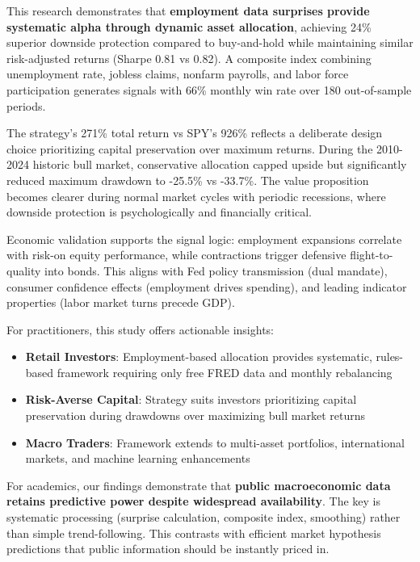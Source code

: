 \documentclass[12pt,a4paper]{article}
\begin{document}
This research demonstrates that \textbf{employment data surprises provide systematic alpha through dynamic asset allocation}, achieving 24\% superior downside protection compared to buy-and-hold while maintaining similar risk-adjusted returns (Sharpe 0.81 vs 0.82). A composite index combining unemployment rate, jobless claims, nonfarm payrolls, and labor force participation generates signals with 66\% monthly win rate over 180 out-of-sample periods.

The strategy's 271\% total return vs SPY's 926\% reflects a deliberate design choice prioritizing capital preservation over maximum returns. During the 2010-2024 historic bull market, conservative allocation capped upside but significantly reduced maximum drawdown to -25.5\% vs -33.7\%. The value proposition becomes clearer during normal market cycles with periodic recessions, where downside protection is psychologically and financially critical.

Economic validation supports the signal logic: employment expansions correlate with risk-on equity performance, while contractions trigger defensive flight-to-quality into bonds. This aligns with Fed policy transmission (dual mandate), consumer confidence effects (employment drives spending), and leading indicator properties (labor market turns precede GDP).

For practitioners, this study offers actionable insights:

\begin{itemize}
    \item \textbf{Retail Investors}: Employment-based allocation provides systematic, rules-based framework requiring only free FRED data and monthly rebalancing

    \item \textbf{Risk-Averse Capital}: Strategy suits investors prioritizing capital preservation during drawdowns over maximizing bull market returns

    \item \textbf{Macro Traders}: Framework extends to multi-asset portfolios, international markets, and machine learning enhancements
\end{itemize}

For academics, our findings demonstrate that \textbf{public macroeconomic data retains predictive power despite widespread availability}. The key is systematic processing (surprise calculation, composite index, smoothing) rather than simple trend-following. This contrasts with efficient market hypothesis predictions that public information should be instantly priced in.
\end{document}

